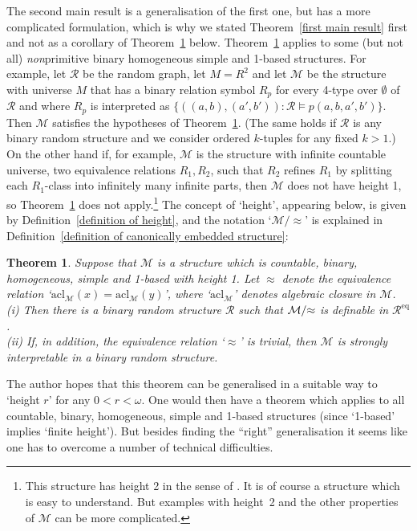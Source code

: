 \documentclass[11pt, twoside]{amsart}
\newtheorem{theor}{Theorem}[section]
\numberwithin{equation}{section}
\newcommand{\acl}{\mathrm{acl}}
\newcommand{\es}{\emptyset}
\newcommand{\nts}{\negthickspace}
\newcommand{\approxc}{\nts \approx}
\newcommand{\meq}{^{\mathrm{eq}}}
\newcommand{\mcM}{\mathcal{M}}
\newcommand{\mcR}{\mathcal{R}}
\begin{document}
The second main result is a generalisation of the first one, but has a more complicated formulation, which
is why we stated Theorem~\ref{first main result} first and not as a corollary of Theorem~\ref{second main result} below.
Theorem~\ref{second main result} applies to some (but not all) {\em non}primitive binary homogeneous simple and 1-based structures.
For example, let $\mcR$ be the random graph, let $M = R^2$ and
let $\mcM$ be the structure with universe $M$ that has a binary relation symbol $R_p$ for every 4-type over $\es$ of $\mcR$
and where $R_p$ is interpreted as $\{((a,b), (a',b')) : \mcR \models p(a,b,a',b')\}$. 
Then $\mcM$ satisfies the hypotheses of Theorem~\ref{second main result}.
(The same holds if $\mcR$ is any binary random structure and we consider ordered $k$-tuples for any fixed $k > 1$.)
On the other hand if, for example, $\mcM$ is the structure with infinite countable universe,
two equivalence relations $R_1, R_2$, such that $R_2$ refines $R_1$ by splitting each $R_1$-class into infinitely many
infinite parts, then $\mcM$ does not have height 1, so Theorem~\ref{second main result} does not apply.\footnote{
This structure has height 2 in the sense of \cite{Djo06}. It is of course a structure which is easy to understand. 
But examples with height~2 and the other properties of $\mcM$ can be more complicated.}
The concept of `height', appearing below, is given by Definition~\ref{definition of height},
and the notation `$\mcM / \approx$'
is explained in Definition~\ref{definition of canonically embedded structure}:

\begin{theor}\label{second main result}
Suppose that $\mcM$ is a structure which is countable, binary, homogeneous, simple and 1-based with height 1.
Let $\approx$ denote the equivalence relation `$\acl_\mcM(x) = \acl_\mcM(y)$', where `$\acl_\mcM$' denotes algebraic closure in $\mcM$.\\
(i) Then there is a binary random structure $\mcR$ such that $\mcM / \approxc$ is definable in $\mcR\meq$.\\
(ii) If, in addition, the equivalence relation `$\approx$' is trivial, 
then $\mcM$ is strongly interpretable in a binary random structure.
\end{theor}

\noindent
The author hopes that this theorem can be generalised in a suitable way to `height $r$' for any $0 < r < \omega$.
One would then have a theorem which applies to all countable, binary, homogeneous, simple and 1-based structures
(since `1-based' implies `finite height'). 
But besides finding the ``right'' generalisation it seems like one has to overcome a number of technical difficulties.
\end{document}
